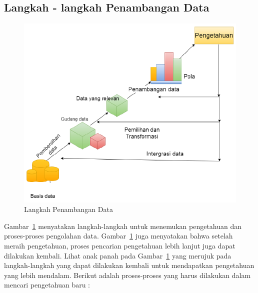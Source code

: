 \subsection{Langkah - langkah Penambangan Data}

\begin{figure}[H]
	\centering
	\includegraphics[scale=0.7]{GambarIO/langkah-data-mining}
	\caption[Langkah Penambangan Data]{Langkah Penambangan Data\footnotemark}
	\label{fig:Langkah Penambangan Data}
\end{figure}

Gambar~\ref{fig:Langkah Penambangan Data} menyatakan langkah-langkah untuk menemukan pengetahuan dan proses-proses pengolahan data. Gambar~\ref{fig:Langkah Penambangan Data} juga menyatakan bahwa setelah meraih pengetahuan, proses pencarian pengetahuan lebih lanjut juga dapat dilakukan kembali. Lihat anak panah pada Gambar~\ref{fig:Langkah Penambangan Data} yang merujuk pada langkah-langkah yang dapat dilakukan kembali untuk mendapatkan pengetahuan yang lebih mendalam. Berikut adalah proses-proses yang harus dilakukan dalam mencari pengetahuan baru \cite{DataMiningIntro:2015}:

